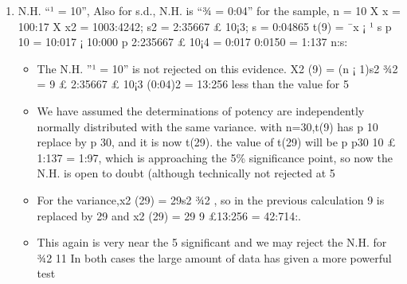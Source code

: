 \documentclass[a4paper,12pt]{article}
\begin{document}
\begin{enumerate}
\item N.H. “¹ = 10”, Also for s.d., N.H. is “¾ = 0:04”
for the sample,
n = 10
X
x = 100:17
X
x2 = 1003:4242; s2 = 2:35667 £ 10¡3; s = 0:04865
t(9) =
¯x ¡ ¹
s
p
10
=
10:017 ¡ 10:000
p
2:235667 £ 10¡4
=
0:017
0:0150
= 1:137 n:s:
\begin{itemize}
    \item The N.H. ”¹ = 10” is not rejected on this evidence.
X2
(9) =
(n ¡ 1)s2
¾2 =
9 £ 2:35667 £ 10¡3
(0:04)2 = 13:256
less than the value for 5%
\item We have assumed the determinations of potency are independently normally distributed
with the same variance.
with n=30,t(9) has
p
10 replace by
p
30, and it is now t(29). the value of t(29) will be
p
p30
10
£
1:137 = 1:97, which is approaching the 5\% significance point, so now the N.H. is open
to doubt (although technically not rejected at 5%
\item For the variance,x2
(29) = 29s2
¾2 , so in the previous calculation 9 is replaced by 29 and
x2
(29) = 29
9 £13:256 = 42:714:. 
\item This again is very near the 5%
significant and we may reject the N.H. for ¾2
11
In both cases the large amount of data has given a more powerful test
\end{itemize}

\end{enumerate}
\end{document}
